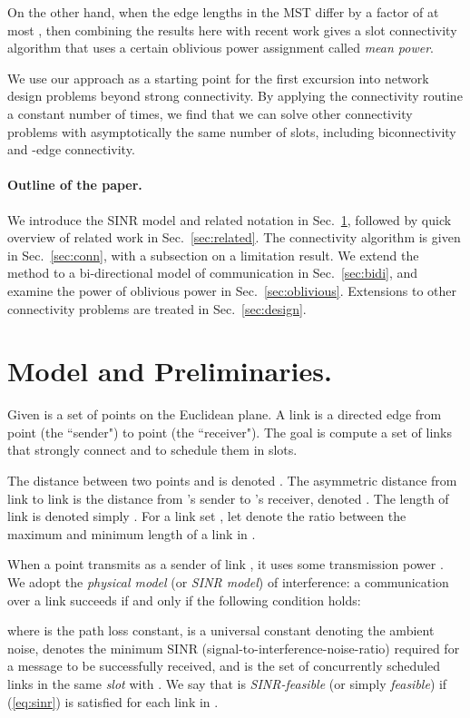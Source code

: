 \documentclass[11pt]{amsart}
\begin{document}
On the other hand, when the edge lengths in the MST differ by a factor
of at most , then combining the results here with recent work
\cite{SODA11} gives a  slot
connectivity algorithm that uses a certain oblivious power assignment
called \emph{mean power}.



We use our approach as a starting point for the first excursion into
network design problems beyond strong connectivity.
By applying the connectivity routine a constant number of times, we
find that we can solve other connectivity problems with asymptotically
the same number of slots, including biconnectivity and -edge
connectivity.


\paragraph{Outline of the paper.}
We introduce the SINR model and related notation in
Sec.~\ref{sec:model}, followed by quick overview of related work in Sec.~\ref{sec:related}.
The connectivity algorithm is given in Sec.~\ref{sec:conn},
with a subsection on a limitation result.
We extend the method to a bi-directional model
of communication in Sec.~\ref{sec:bidi}, and examine the power of oblivious
power in Sec.~\ref{sec:oblivious}.
Extensions to other connectivity problems are treated in Sec.~\ref{sec:design}.

\section{Model and Preliminaries.}
\label{sec:model}

Given is a set  of points on the Euclidean plane.
A link  is a directed edge from point  (the ``sender") to point  (the ``receiver").
The goal is compute a set of links that strongly connect  and to schedule them
in  slots.

The distance between two points  and  is denoted . The asymmetric distance from link  to link  is the distance from
's sender to 's receiver, denoted . The length of link  is denoted  simply .
For a link set , let  denote the ratio between the maximum and minimum length of a link in .

When a point  transmits as a sender of link , it uses some transmission power .
We adopt the \emph{physical model} (or \emph{SINR model})
of interference: a communication over a link  succeeds if and only if the
following condition holds:

where  is the path loss constant,  is a universal constant denoting the ambient noise,  denotes the minimum
SINR (signal-to-interference-noise-ratio) required for a message to be successfully received,
and  is the set of concurrently scheduled links in the same \emph{slot} with .
We say that  is \emph{SINR-feasible} (or simply \emph{feasible}) if (\ref{eq:sinr}) is
satisfied for each link in . 
\end{document}
